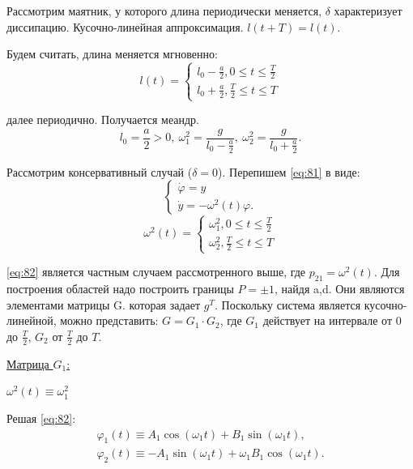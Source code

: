 Рассмотрим маятник, у которого длина периодически меняется, $\delta$ характеризует диссипацию. Кусочно-линейная аппроксимация. $l(t+T)=l(t)$.

Будем считать, длина меняется мгновенно:
\begin{equation*}
	l(t)=
	\begin{cases}
		l_0-\frac{a}{2}, 0 \leq t \leq \frac{T}{2} \\
		l_0+\frac{a}{2}, \frac{T}{2} \leq t \leq T		
	\end{cases}
\end{equation*}

далее периодично. Получается меандр.
\begin{equation*}
	l_0=\frac{a}{2}>0,~\omega_1^2=\frac{g}{l_0-\frac{a}{2}},~\omega_2^2=\frac{g}{l_0+\frac{a}{2}}.
\end{equation*}

Рассмотрим консервативный случай ($\delta=0$). Перепишем \eqref{eq:81} в виде:
\begin{equation}
	\begin{cases}
		\dot{\varphi}=y \\
		\dot{y} =-\omega^2(t)\varphi.	
	\end{cases}
	\label{eq:82}
\end{equation}
\begin{equation}
	\omega^2(t)=
	\begin{cases}
		\omega^2_1, 0 \leq t \leq \frac{T}{2} \\
		\omega^2_2, \frac{T}{2} \leq t \leq T		
	\end{cases}
	\label{eq:83}	
\end{equation}

\eqref{eq:82} является частным случаем рассмотренного выше, где $p_{21}=\omega^2(t)$. Для построения областей надо построить границы $P=\pm 1$, найдя a,d. Они являются элементами матрицы G. которая задает $g^T$. Поскольку система является кусочно-линейной, можно представить: $G=G_1\cdot G_2$, где $G_1$ действует на интервале от 0 до $\frac{T}{2}$, $G_2$ от $\frac{T}{2}$ до $T$. 

\underline{Матрица $G_1$:}

$\omega^2(t)\equiv\omega_1^2$

Решая \eqref{eq:82}:
\begin{gather*}
	\varphi_1(t)\equiv A_1 \cos(\omega_1 t) + B_1\sin(\omega_1 t), \\
	\varphi_2(t)\equiv -A_1 \sin(\omega_1 t) + \omega_1 B_1\cos(\omega_1 t).
\end{gather*}

